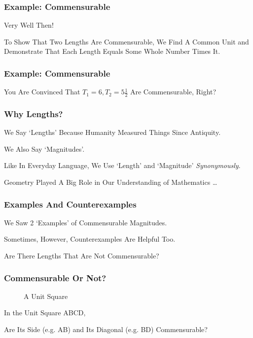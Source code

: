\documentclass{beamer}
\begin{document}
\begin{frame}
\frametitle{Example: Commensurable}

Very Well Then! 

\pause

To Show That Two Lengths Are Commensurable, We Find A Common Unit and Demonstrate That Each Length Equals Some Whole Number Times It.
\end{frame}

\begin{frame}
\frametitle{Example: Commensurable}

You Are Convinced That $T_1=6,T_2=5\frac{1}{2}$ Are Commensurable, Right?

\end{frame}




\begin{frame}
\frametitle{Why Lengths?}
We Say `Lengths' Because Humanity Measured Things Since Antiquity.

\pause

We Also Say `Magnitudes'.

\pause

Like In Everyday Language, We Use `Length' and `Magnitude' \textit{Synonymously}.

\pause

Geometry Played A Big Role in Our Understanding of Mathematics \dots
\end{frame}

\begin{frame}
\frametitle{Examples And Counterexamples}

We Saw 2 `Examples' of Commensurable Magnitudes.

Sometimes, However, Counterexamples Are Helpful Too.

\pause

Are There Lengths That Are \alert{Not} Commensurable?

\end{frame}


\begin{frame}
\frametitle{Commensurable Or Not?}

\pause

\begin{figure}
\centering
{}
\caption{A Unit Square}
\label{fig:unitsq}
\end{figure}

In the Unit Square ABCD, 

Are Its Side (\pause e.g. AB) and Its Diagonal (\pause e.g. BD) Commensurable?

\end{frame}
\end{document}
